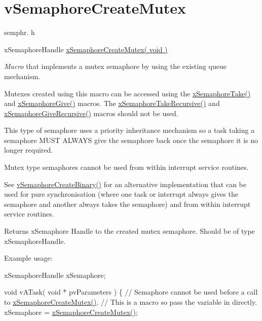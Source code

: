 \hypertarget{group__vSemaphoreCreateMutex}{}\section{v\+Semaphore\+Create\+Mutex}
\label{group__vSemaphoreCreateMutex}
semphr. h 
\begin{DoxyPre}xSemaphoreHandle \hyperlink{semphr_8h_aa6a00aa9b91a9e5b3ebe4ae1c3f115c6}{xSemaphoreCreateMutex( void )}\end{DoxyPre}


{\itshape Macro} that implements a mutex semaphore by using the existing queue mechanism.

Mutexes created using this macro can be accessed using the \hyperlink{semphr_8h_af116e436d2a5ae5bd72dbade2b5ea930}{x\+Semaphore\+Take()} and \hyperlink{semphr_8h_aae55761cabfa9bf85c8f4430f78c0953}{x\+Semaphore\+Give()} macros. The \hyperlink{semphr_8h_ad395f4bba51eea6af3397d72bc079e4d}{x\+Semaphore\+Take\+Recursive()} and \hyperlink{semphr_8h_a398d66b17856c22dd49d39aaac42f105}{x\+Semaphore\+Give\+Recursive()} macros should not be used.

This type of semaphore uses a priority inheritance mechanism so a task \textquotesingle{}taking\textquotesingle{} a semaphore M\+U\+ST A\+L\+W\+A\+YS \textquotesingle{}give\textquotesingle{} the semaphore back once the semaphore it is no longer required.

Mutex type semaphores cannot be used from within interrupt service routines.

See \hyperlink{semphr_8h_ae10bffadd26fbd5bcce76bf33a83ef30}{v\+Semaphore\+Create\+Binary()} for an alternative implementation that can be used for pure synchronisation (where one task or interrupt always \textquotesingle{}gives\textquotesingle{} the semaphore and another always \textquotesingle{}takes\textquotesingle{} the semaphore) and from within interrupt service routines.

\begin{DoxyReturn}{Returns}
x\+Semaphore Handle to the created mutex semaphore. Should be of type x\+Semaphore\+Handle.
\end{DoxyReturn}
Example usage\+: 
\begin{DoxyPre}
xSemaphoreHandle xSemaphore;\end{DoxyPre}



\begin{DoxyPre}void vATask( void * pvParameters )
\{
   // Semaphore cannot be used before a call to \hyperlink{semphr_8h_aa6a00aa9b91a9e5b3ebe4ae1c3f115c6}{xSemaphoreCreateMutex()}.
   // This is a macro so pass the variable in directly.
   xSemaphore = \hyperlink{semphr_8h_aa6a00aa9b91a9e5b3ebe4ae1c3f115c6}{xSemaphoreCreateMutex()};\end{DoxyPre}



